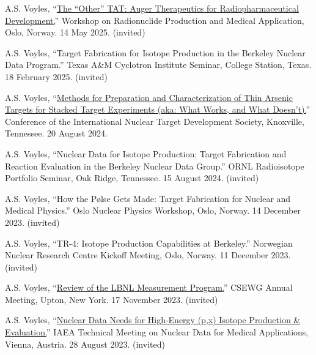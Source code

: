 \begin{bibsection}

\item A.S. Voyles, \enquote{\href{https://www.nnrc.uio.no/english/news-and-events/events/radionuclide-production-and-medical-application.html}{The “Other” TAT: Auger Therapeutics for Radiopharmaceutical Development.}} Workshop on Radionuclide Production and Medical Application, Oslo, Norway. 14 May 2025. (invited)


\item A.S. Voyles, \enquote{Target Fabrication for Isotope Production in the Berkeley Nuclear Data Program.} Texas A\&M Cyclotron Institute Seminar, College Station, Texas. 18 February 2025. (invited)

\item A.S. Voyles, \enquote{\href{https://intds2024.ornl.gov/}{Methods for Preparation and Characterization of Thin Arsenic Targets for Stacked Target Experiments (aka:  What Works, and What Doesn’t).}}  Conference of the International Nuclear Target Development Society, Knoxville, Tennessee. 20 August 2024.

\item A.S. Voyles, \enquote{Nuclear Data for Isotope Production: Target Fabrication and Reaction Evaluation in the Berkeley Nuclear Data Group.} ORNL Radioisotope Portfolio Seminar, Oak Ridge, Tennessee. 15 August 2024. (invited)

\item A.S. Voyles, \enquote{How the Pølse Gets Made: Target Fabrication for Nuclear and Medical Physics.} Oslo Nuclear Physics Workshop, Oslo, Norway. 14 December 2023. (invited)

\item A.S. Voyles, \enquote{TR-4: Isotope Production Capabilities at Berkeley.} Norwegian Nuclear Research Centre Kickoff Meeting, Oslo, Norway. 11 December 2023. (invited)

\item A.S. Voyles, \enquote{\href{https://indico.bnl.gov/event/18701/}{Review of the LBNL Measurement Program.}} CSEWG Annual Meeting, Upton, New York. 17 November 2023. (invited)


\item A.S. Voyles, \enquote{\href{https://nds.iaea.org/publications/indc/indc-nds-0884/}{Nuclear Data Needs for High-Energy (p,x) Isotope Production \& Evaluation.}} IAEA Technical Meeting on Nuclear Data for Medical Applications, Vienna, Austria. 28 August 2023. (invited)


\end{bibsection}
